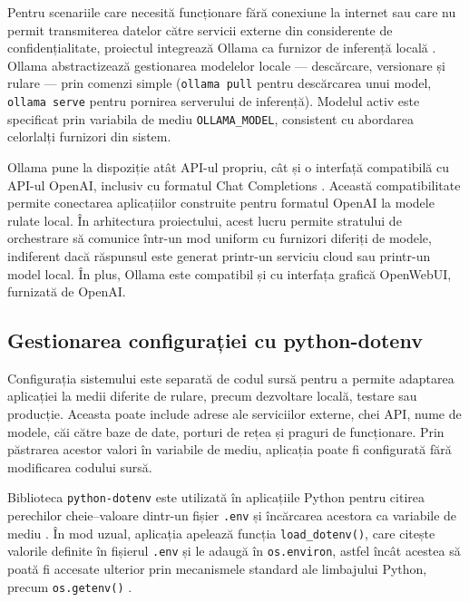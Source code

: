 \documentclass[12pt, a4paper, oneside, romanian]{teza-upb}
\begin{document}
Pentru scenariile care necesită funcționare fără conexiune la internet sau care 
nu permit transmiterea datelor către servicii externe din considerente de 
confidențialitate, proiectul integrează Ollama ca furnizor de inferență locală 
\cite{ollama_doc}. Ollama abstractizează gestionarea modelelor locale — 
descărcare, versionare și rulare — prin comenzi simple (\texttt{ollama pull} 
pentru descărcarea unui model, \texttt{ollama serve} pentru pornirea serverului 
de inferență). Modelul activ este specificat prin variabila de mediu 
\texttt{OLLAMA\_MODEL}, consistent cu abordarea celorlalți furnizori din sistem.


Ollama pune la dispoziție atât API-ul propriu, cât și o interfață compatibilă cu API-ul OpenAI, inclusiv cu formatul Chat Completions \cite{ollama_openai_compatibility}. Această compatibilitate permite conectarea aplicațiilor construite pentru formatul OpenAI la modele rulate local. În arhitectura proiectului, acest lucru permite stratului de orchestrare să comunice într-un mod uniform cu furnizori diferiți de modele, indiferent dacă răspunsul este generat printr-un serviciu cloud sau printr-un model local. În plus, Ollama este compatibil și cu interfața grafică OpenWebUI, furnizată de OpenAI.


\subsection{Gestionarea configurației cu python-dotenv}

Configurația sistemului este separată de codul sursă pentru a permite adaptarea aplicației la medii diferite de rulare, precum dezvoltare locală, testare sau producție. Aceasta poate include adrese ale serviciilor externe, chei API, nume de modele, căi către baze de date, porturi de rețea și praguri de funcționare. Prin păstrarea acestor valori în variabile de mediu, aplicația poate fi configurată fără modificarea codului sursă.

Biblioteca \texttt{python-dotenv} este utilizată în aplicațiile Python pentru citirea perechilor cheie--valoare dintr-un fișier \texttt{.env} și încărcarea acestora ca variabile de mediu \cite{python_dotenv_doc}. În mod uzual, aplicația apelează funcția \texttt{load\_dotenv()}, care citește valorile definite în fișierul \texttt{.env} și le adaugă în \texttt{os.environ}, astfel încât acestea să poată fi accesate ulterior prin mecanismele standard ale limbajului Python, precum \texttt{os.getenv()} \cite{python_dotenv_doc}.
\end{document}
